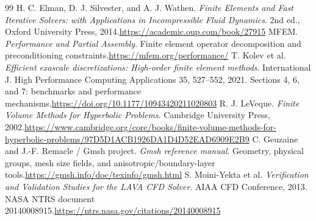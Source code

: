 \documentclass[11pt,a4paper]{article}
\begin{document}
\begin{thebibliography}{99}
 H. C. Elman, D. J. Silvester, and A. J. Wathen. \emph{Finite Elements and Fast Iterative Solvers: with Applications in Incompressible Fluid Dynamics}. 2nd ed., Oxford University Press, 2014.\newline\url{https://academic.oup.com/book/27915}
 MFEM. \emph{Performance and Partial Assembly}. Finite element operator decomposition and preconditioning constraints.\newline\url{https://mfem.org/performance/}
 T. Kolev et al. \emph{Efficient exascale discretizations: High-order finite element methods}. International J. High Performance Computing Applications 35, 527--552, 2021. Sections 4, 6, and 7: benchmarks and performance mechanisms.\newline\url{https://doi.org/10.1177/10943420211020803}
 R. J. LeVeque. \emph{Finite Volume Methods for Hyperbolic Problems}. Cambridge University Press, 2002.\newline\url{https://www.cambridge.org/core/books/finite-volume-methods-for-hyperbolic-problems/97D5D1ACB1926DA1D4D52EAD6909E2B9}
 C. Geuzaine and J.-F. Remacle / Gmsh project. \emph{Gmsh reference manual}. Geometry, physical groups, mesh size fields, and anisotropic/boundary-layer tools.\newline\url{https://gmsh.info/doc/texinfo/gmsh.html}
 S. Moini-Yekta et al. \emph{Verification and Validation Studies for the LAVA CFD Solver}. AIAA CFD Conference, 2013. NASA NTRS document 20140008915.\newline\url{https://ntrs.nasa.gov/citations/20140008915}
\end{thebibliography}
\end{document}
